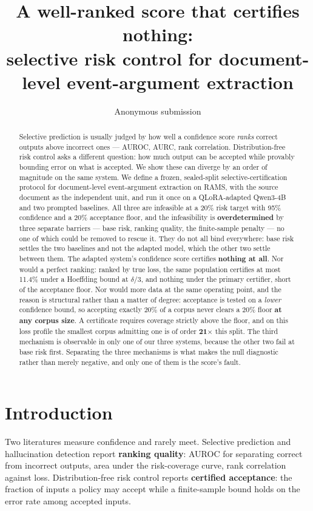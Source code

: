 \documentclass[11pt]{article}
\title{A well-ranked score that certifies nothing:\\
selective risk control for document-level event-argument extraction}
\author{Anonymous submission}
\begin{document}
\maketitle

\begin{abstract}
Selective prediction is usually judged by how well a confidence score \emph{ranks} correct outputs
above incorrect ones --- AUROC, AURC, rank correlation. Distribution-free risk control asks a
different question: how much output can be accepted while provably bounding error on what is
accepted. We show these can diverge by an order of magnitude on the same system. We define a
frozen, sealed-split selective-certification protocol for document-level event-argument extraction
on RAMS, with the source document as the independent unit, and run it once on a QLoRA-adapted
Qwen3-4B and two prompted baselines. All three are infeasible at a 20\% risk target with 95\%
confidence and a 20\% acceptance floor, and the infeasibility is \textbf{overdetermined} by three
separate barriers --- base risk, ranking quality, the finite-sample penalty --- no one of which
could be removed to rescue it. They do not all bind everywhere: base risk settles the two baselines
and not the adapted model, which the other two settle between them. The
adapted system's confidence score certifies \textbf{nothing at all}. Nor would a perfect ranking:
ranked by true loss, the same population certifies at most 11.4\% under a Hoeffding bound at
$\delta/3$, and nothing under the primary certifier, short of the acceptance floor. Nor
would more data at the same operating point, and the reason is structural rather than a matter of
degree: acceptance is tested on a \emph{lower} confidence bound, so accepting exactly 20\% of a
corpus never clears a 20\% floor \textbf{at any corpus size}. A certificate requires coverage
strictly above the floor, and on this loss profile the smallest corpus admitting one is of order
\textbf{21$\times$} this split. The third mechanism is
observable in only one of our three systems, because the other two fail at base risk first. Separating the
three mechanisms is what makes the null diagnostic rather than merely negative, and only one of
them is the score's fault.
\end{abstract}

\section{Introduction}

Two literatures measure confidence and rarely meet. Selective prediction and hallucination
detection report \textbf{ranking quality}: AUROC for separating correct from incorrect outputs,
area under the risk-coverage curve, rank correlation against loss. Distribution-free risk control
\cite{angelopoulos2024crc} reports \textbf{certified acceptance}: the fraction of inputs a policy
may accept while a finite-sample bound holds on the error rate among accepted inputs.
\end{document}
